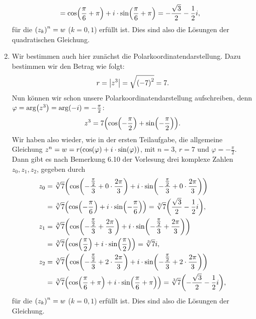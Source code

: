 \documentclass[german,12pt]{homework}
\DeclarePairedDelimiter{\absolute}{\lvert}{\rvert}
\DeclarePairedDelimiter{\enbrace}{(}{)}
\begin{document}
\begin{enumerate}
\begin{align*}
            &= \cos\enbrace*{\frac{\pi}{6} + \pi} + i \cdot \sin\enbrace*{\frac{\pi}{6} + \pi} = -\frac{\sqrt{3}}{2} - \frac{1}{2}i,
        \end{align*}
        für die \(\enbrace*{z_k}^n = w\) (\(k = 0, 1\)) erfüllt ist. Dies sind also die Lösungen der quadratischen Gleichung.
        \item Wir bestimmen auch hier zunächst die Polarkoordinatendarstellung. Dazu bestimmen wir den Betrag wie folgt:
        \[r = \absolute*{z^3} = \sqrt{\enbrace*{-7}^2} = 7.\]
        Nun können wir schon unsere Polarkoordinatendarstellung aufschreiben, denn \(\varphi = \arg\enbrace*{z^3} = \arg\enbrace*{-i} = -\frac{\pi}{2}\):
        \[z^3 = 7\enbrace*{\cos\enbrace*{-\frac{\pi}{2}} + \sin\enbrace*{-\frac{\pi}{2}}}.\]
        Wir haben also wieder, wie in der ersten Teilaufgabe, die allgemeine Gleichung \(z^n = w = r\enbrace*{\cos\enbrace*{\varphi} + i \cdot \sin\enbrace*{\varphi}}\), mit \(n = 3\), \(r = 7\) und \(\varphi = -\frac{\pi}{2}\). Dann gibt es nach Bemerkung 6.10 der Vorlesung drei komplexe Zahlen \(z_0, z_1, z_2\), gegeben durch
        \begin{align*}
            z_0 &= \sqrt[3]{7}\enbrace*{\cos\enbrace*{-\frac{\frac{\pi}{2}}{3} + 0 \cdot \frac{2\pi}{3}} + i \cdot \sin\enbrace*{-\frac{\frac{\pi}{2}}{3} + 0 \cdot \frac{2\pi}{3}}}\\
            &= \sqrt[3]{7}\enbrace*{\cos\enbrace*{-\frac{\pi}{6}} + i \cdot \sin\enbrace*{-\frac{\pi}{6}}} = \sqrt[3]{7}\enbrace*{\frac{\sqrt{3}}{2} - \frac{1}{2}i},\\
            z_1 &= \sqrt[3]{7}\enbrace*{\cos\enbrace*{-\frac{\frac{\pi}{2}}{3} + \frac{2\pi}{3}} + i \cdot \sin\enbrace*{-\frac{\frac{\pi}{2}}{3} + \frac{2\pi}{3}}}\\
            &= \sqrt[3]{7}\enbrace*{\cos\enbrace*{\frac{\pi}{2}} + i \cdot \sin\enbrace*{\frac{\pi}{2}}} = \sqrt[3]{7}i,\\
            z_2 &= \sqrt[3]{7}\enbrace*{\cos\enbrace*{-\frac{\frac{\pi}{2}}{3} + 2 \cdot \frac{2\pi}{3}} + i \cdot \sin\enbrace*{-\frac{\frac{\pi}{2}}{3} + 2 \cdot \frac{2\pi}{3}}}\\
            &= \sqrt[3]{7}\enbrace*{\cos\enbrace*{\frac{\pi}{6} + \pi} + i \cdot \sin\enbrace*{\frac{\pi}{6} + \pi}} = \sqrt[3]{7}\enbrace*{-\frac{\sqrt{3}}{2} - \frac{1}{2}i},
        \end{align*}
        für die \(\enbrace*{z_k}^n = w\) (\(k = 0, 1\)) erfüllt ist. Dies sind also die Lösungen der Gleichung.
    \end{enumerate}
\end{document}
